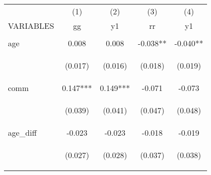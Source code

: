 \begin{center}
\begin{tabular}{lcccc} \hline
 & (1) & (2) & (3) & (4) \\
VARIABLES & gg & y1 & rr & y1 \\ \hline
\vspace{4pt} & \begin{footnotesize}\end{footnotesize} & \begin{footnotesize}\end{footnotesize} & \begin{footnotesize}\end{footnotesize} & \begin{footnotesize}\end{footnotesize} \\
age & 0.008 & 0.008 & -0.038** & -0.040** \\
\vspace{4pt} & \begin{footnotesize}(0.017)\end{footnotesize} & \begin{footnotesize}(0.016)\end{footnotesize} & \begin{footnotesize}(0.018)\end{footnotesize} & \begin{footnotesize}(0.019)\end{footnotesize} \\
comm & 0.147*** & 0.149*** & -0.071 & -0.073 \\
\vspace{4pt} & \begin{footnotesize}(0.039)\end{footnotesize} & \begin{footnotesize}(0.041)\end{footnotesize} & \begin{footnotesize}(0.047)\end{footnotesize} & \begin{footnotesize}(0.048)\end{footnotesize} \\
age\_diff & -0.023 & -0.023 & -0.018 & -0.019 \\
\vspace{4pt} & \begin{footnotesize}(0.027)\end{footnotesize} & \begin{footnotesize}(0.028)\end{footnotesize} & \begin{footnotesize}(0.037)\end{footnotesize} & \begin{footnotesize}(0.038)\end{footnotesize} \\

\end{tabular}
\end{center}
